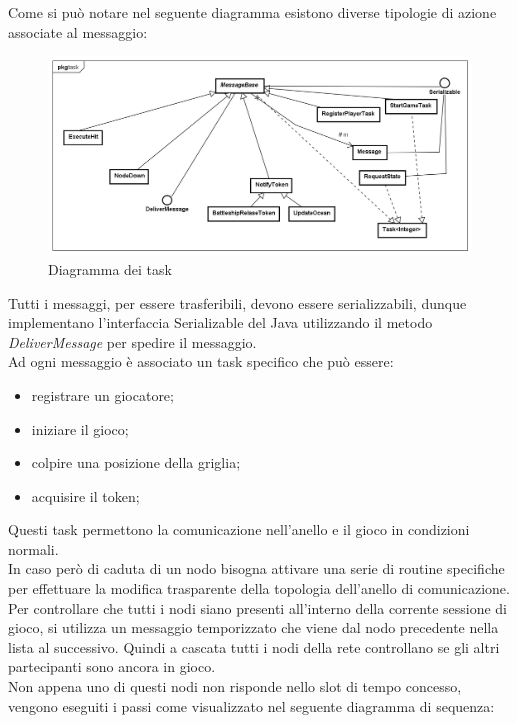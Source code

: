 \documentclass{llncs}
\begin{document}
Come si può notare nel seguente diagramma esistono diverse tipologie di azione associate al messaggio:
\begin{figure}[H]
\centering
    \includegraphics[width=12cm]{imgs/Task-diagram.png}
     \caption{Diagramma dei task}
   \label{output:blacknoxis_normal}
\end{figure}
Tutti i messaggi, per essere trasferibili, devono essere serializzabili, dunque implementano l'interfaccia Serializable del Java utilizzando il metodo \emph{DeliverMessage} per spedire il messaggio.\\
Ad ogni messaggio è associato un task specifico che può essere:
\begin{itemize}
	\item registrare un giocatore;
	\item iniziare il gioco;
	\item colpire una posizione della griglia;
	\item acquisire il token;
\end{itemize}
Questi task permettono la comunicazione nell'anello e il gioco in condizioni normali.\\
In caso però di caduta di un nodo bisogna attivare una serie di routine specifiche per effettuare la modifica trasparente della topologia dell'anello di comunicazione.\\
Per controllare che tutti i nodi siano presenti all'interno della corrente sessione di gioco, si utilizza un messaggio temporizzato che viene dal nodo precedente nella lista al successivo. Quindi a cascata tutti i nodi della rete controllano se gli altri partecipanti sono ancora in gioco.\\
Non appena uno di questi nodi non risponde nello slot di tempo concesso, vengono
eseguiti i passi come visualizzato nel seguente diagramma di sequenza: 
\end{document}
